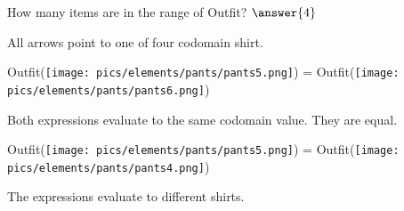 \documentclass{ximera}
\begin{document}
\begin{exercise}
How many items are in the range of Outfit? $\answer{4}$
  \begin{feedback}
All arrows point to one of four codomain shirt.
  \end{feedback}
\end{exercise}







\begin{exercise}
 Outfit({\texttt{[image: pics/elements/pants/pants5.png]}}) = Outfit({\texttt{[image: pics/elements/pants/pants6.png]}}) 
  \begin{multipleChoice}
  \end{multipleChoice}
  \begin{feedback}
Both expressions evaluate to the same codomain value.  They are equal.
  \end{feedback}
\end{exercise}




\begin{exercise}
 Outfit({\texttt{[image: pics/elements/pants/pants5.png]}}) = Outfit({\texttt{[image: pics/elements/pants/pants4.png]}}) 
  \begin{multipleChoice}
  \end{multipleChoice}
  \begin{feedback}
The expressions evaluate to different shirts.
  \end{feedback}
\end{exercise}
\end{document}
